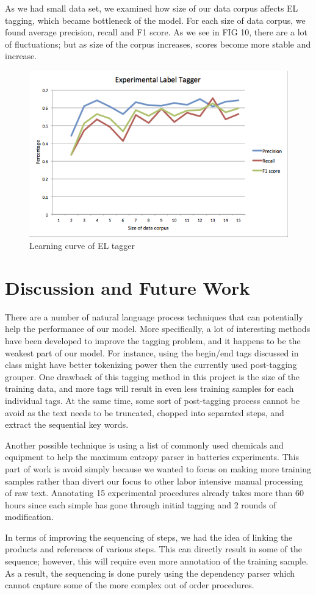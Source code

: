 As we had small data set, we examined how size of our data corpus affects EL tagging, which became bottleneck of the model. For each size of data corpus, we found average precision, recall and F1 score. As we see in FIG 10, there are a lot of fluctuations; but as size of the corpus increases, scores become more stable and increase. 
\begin{figure}
  \centering
    \includegraphics[width=.5\textwidth]{ELtagger.png}
  \caption{Learning curve of EL tagger}
\end{figure}

\section{Discussion and Future Work}

There are a number of natural language process techniques that can potentially help the performance of our model. More specifically, a lot of interesting methods have been developed to improve the tagging problem, and it happens to be the weakest part of our model. For instance, using the begin/end tags discussed in class might have better tokenizing power then the currently used post-tagging grouper. One drawback of this tagging method in this project is the size of the training data, and more tags will result in even less training samples for each individual tags. At the same time, some sort of post-tagging process cannot be avoid as the text needs to be truncated, chopped into separated steps, and extract the sequential key words. 

Another possible technique is using a list of commonly used chemicals and equipment to help the maximum entropy parser in batteries experiments. This part of work is avoid simply because we wanted to focus on making more training samples rather than divert our focus to other labor intensive manual processing of raw text. Annotating 15 experimental procedures already takes more than 60 hours since each simple has gone through initial tagging and 2 rounds of modification. 

In terms of improving the sequencing of steps, we had the idea of linking the products and references of various steps. This can directly result in some of the sequence; however, this will require even more annotation of the training sample. As a result, the sequencing is done purely using the dependency parser which cannot capture some of the more complex out of order procedures. 


